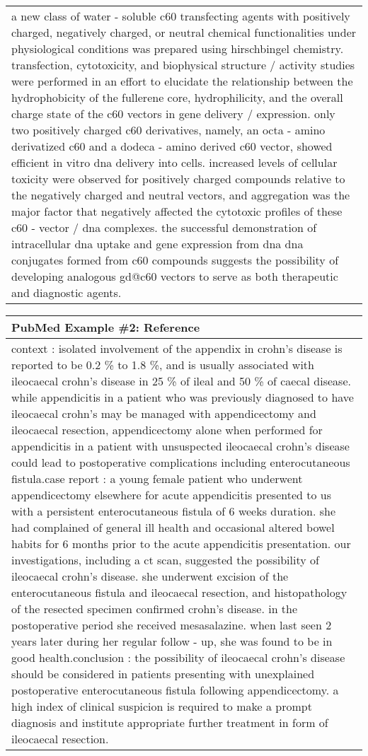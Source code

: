 \begin{table}[!htbp]
\begin{tabular}{p{\linewidth}}
a new class of water - soluble c60 transfecting agents with positively charged, negatively charged, or neutral chemical functionalities under physiological conditions was prepared using hirschbingel chemistry. transfection, cytotoxicity, and biophysical structure / activity studies were performed in an effort to elucidate the relationship between the hydrophobicity of the fullerene core, hydrophilicity, and the overall charge state of the c60 vectors in gene delivery / expression. only two positively charged c60 derivatives, namely, an octa - amino derivatized c60 and a dodeca - amino derived c60 vector, showed efficient in vitro dna delivery into cells. increased levels of cellular toxicity were observed for positively charged compounds relative to the negatively charged and neutral vectors, and aggregation was the major factor that negatively affected the cytotoxic profiles of these c60 - vector / dna complexes. the successful demonstration of intracellular dna uptake and gene expression from dna dna conjugates formed from c60 compounds suggests the possibility of developing analogous gd@c60 vectors to serve as both therapeutic and diagnostic agents.
    \\
    \end{tabular}
    \begin{tabular}{p{\linewidth}} 
    \midrule
    \textbf{PubMed Example \#2: Reference} \\
    \midrule
context : isolated involvement of the appendix in crohn's disease is reported to be 0.2 \% to 1.8 \%, and is usually associated with ileocaecal crohn's disease in 25 \% of ileal and 50 \% of caecal disease. while appendicitis in a patient who was previously diagnosed to have ileocaecal crohn's may be managed with appendicectomy and ileocaecal resection, appendicectomy alone when performed for appendicitis in a patient with unsuspected ileocaecal crohn's disease could lead to postoperative complications including enterocutaneous fistula.case report : a young female patient who underwent appendicectomy elsewhere for acute appendicitis presented to us with a persistent enterocutaneous fistula of 6 weeks duration. she had complained of general ill health and occasional altered bowel habits for 6 months prior to the acute appendicitis presentation. our investigations, including a ct scan, suggested the possibility of ileocaecal crohn's disease. she underwent excision of the enterocutaneous fistula and ileocaecal resection, and histopathology of the resected specimen confirmed crohn's disease. in the postoperative period she received mesasalazine. when last seen 2 years later during her regular follow - up, she was found to be in good health.conclusion : the possibility of ileocaecal crohn's disease  should be considered in patients presenting with unexplained postoperative enterocutaneous fistula following appendicectomy. a high index of clinical suspicion is required to make a prompt diagnosis and institute appropriate further treatment in form of ileocaecal resection.

\end{tabular}
\end{table}
